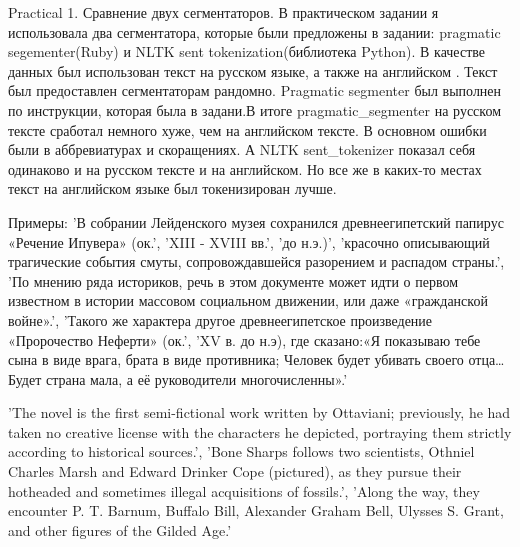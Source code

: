 Practical 1.
Сравнение двух сегментаторов.
В практическом задании я использовала два сегментатора, которые были предложены в задании: pragmatic segementer(Ruby) и NLTK sent tokenization(библиотека Python).
В качестве данных был использован текст на русском языке, а также на английском . 
Текст был предоставлен сегментаторам рандомно. 
Pragmatic segmenter был выполнен по инструкции, которая была в задани.В итоге pragmatic_segmenter на русском тексте сработал немного хуже, чем на английском тексте. В основном ошибки были в аббревиатурах и скоращениях.
А NLTK sent_tokenizer показал себя одинаково и на русском тексте и на английском. Но все же в каких-то местах текст на английском языке был токенизирован лучше. 

Примеры: 
'В собрании Лейденского музея сохранился древнеегипетский папирус «Речение Ипувера» (ок.',
 'XIII - XVIII вв.',
 'до н.э.)',
 'красочно описывающий трагические события смуты, сопровождавшейся разорением и распадом страны.',
 'По мнению ряда историков, речь в этом документе может идти о первом известном в истории массовом социальном движении, или даже «гражданской войне».',
 'Такого же характера другое древнеегипетское произведение «Пророчество Неферти» (ок.',
 'XV в. до н.э), где сказано:«Я показываю тебе сына в виде врага, брата в виде противника; Человек будет убивать своего отца… Будет страна мала, а её руководители многочисленны».'
 
 'The novel is the first semi-fictional work written by Ottaviani; previously, he had taken no creative license with the characters he depicted, portraying them strictly according to historical sources.',
 'Bone Sharps follows two scientists, Othniel Charles Marsh and Edward Drinker Cope (pictured), as they pursue their hotheaded and sometimes illegal acquisitions of fossils.',
 'Along the way, they encounter P. T. Barnum, Buffalo Bill, Alexander Graham Bell, Ulysses S. Grant, and other figures of the Gilded Age.'